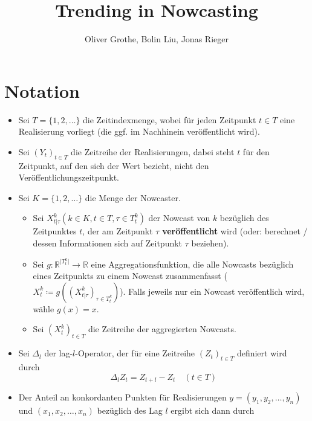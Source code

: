 \documentclass{article}
\title{Trending in Nowcasting}
\author{Oliver Grothe, Bolin Liu, Jonas Rieger}
\theoremstyle{plain}%
\theoremstyle{definition}
\newcommand{\lag}[1][l]{\Delta_{#1}}
\begin{document}
\maketitle




\section{Notation}
\begin{itemize}
  \item Sei $T = \{1, 2, \dots\}$ die Zeitindexmenge, wobei für jeden Zeitpunkt $t \in T$ eine Realisierung vorliegt (die ggf. im Nachhinein veröffentlicht wird).
  \item Sei $(Y_t)_{t \in T}$ die Zeitreihe der Realisierungen, dabei steht $t$ für den Zeitpunkt, auf den sich der Wert bezieht, nicht den Veröffentlichungszeitpunkt.
  \item Sei $K = \{1, 2, \dots\}$ die Menge der Nowcaster.
	\begin{itemize}
	  \item Sei $X_{t \lvert \tau}^k (k \in K, t \in T, \tau \in T_t^k)$ der Nowcast von $k$ bezüglich des Zeitpunktes $t$, der am Zeitpunkt $\tau$ \textbf{veröffentlicht} wird (oder: berechnet / dessen Informationen sich auf Zeitpunkt $\tau$ beziehen).
	  \item Sei $g: \mathbb{R}^{\lvert T_t^k \lvert} \rightarrow \mathbb{R}$ eine Aggregationsfunktion, die alle Nowcasts bezüglich eines Zeitpunkts zu einem Nowcast zusammenfasst ($X_t^k \coloneqq g((X_{t \lvert \tau}^k)_{\tau \in T_t^k})$). Falls jeweils nur ein Nowcast veröffentlich wird, wähle $g(x) = x$.
	  \item Sei $(X_t^k)_{t \in T}$ die Zeitreihe der aggregierten Nowcasts.
	\end{itemize}
  \item Sei $\lag[l]$ der lag-$l$-Operator, der für eine Zeitreihe $(Z_t)_{t \in T}$ definiert wird durch 
		\begin{equation}
			\lag[l]Z_t = Z_{t+l} - Z_t \quad (t \in T)
		\end{equation} 
  \item Der Anteil an konkordanten Punkten für Realisierungen $y = (y_1, y_2, \dots, y_n)$ und $(x_1, x_2, \dots, x_n)$ bezüglich des Lag $l$ ergibt sich dann durch
	\begin{equation}

\end{equation}
\end{itemize}
\end{document}
